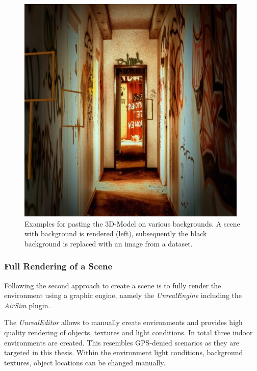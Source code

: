 \begin{figure}[hbtp]
\begin{minipage}{0.49\textwidth}
		\includegraphics[width=\textwidth]{fig/random_bg2}
	\end{minipage}
	\caption{Examples for pasting the 3D-Model on various backgrounds. A scene with background is rendered (left), subsequently the black background is replaced with an image from a dataset.}
	\label{fig:random_bg}
\end{figure}

\subsubsection{Full Rendering of a Scene}

Following \cite{Ros2016, Gaidon2016, Johnson-Roberson2016, Tobin2017, Tremblay2018a} the second approach to create a scene is to fully render the environment using a graphic engine, namely the \textit{UnrealEngine} including the \textit{AirSim} plugin.

The \textit{UnrealEditor} allows to manually create environments and provides high quality rendering of objects, textures and light conditions. In total three indoor environments are created. This resembles \ac{GPS}-denied scenarios as they are targeted in this thesis. Within the environment light conditions, background textures, object locations can be changed manually.

